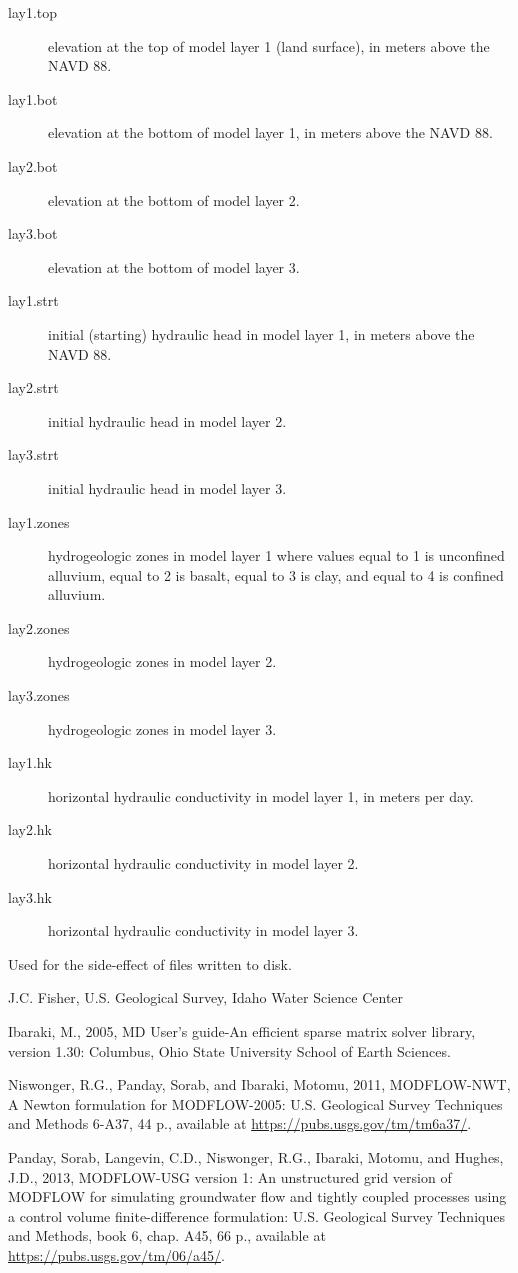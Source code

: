 \documentclass[a4paper]{book}
\begin{document}
\begin{Details}
\begin{description}
\item[lay1.top] elevation at the top of model layer 1 (land surface),
in meters above the NAVD 88.
\item[lay1.bot] elevation at the bottom of model layer 1, in meters above the NAVD 88.
\item[lay2.bot] elevation at the bottom of model layer 2.
\item[lay3.bot] elevation at the bottom of model layer 3.
\item[lay1.strt] initial (starting) hydraulic head in model layer 1,
in meters above the NAVD 88.
\item[lay2.strt] initial hydraulic head in model layer 2.
\item[lay3.strt] initial hydraulic head in model layer 3.
\item[lay1.zones] hydrogeologic zones in model layer 1 where values
equal to 1 is unconfined alluvium, equal to 2 is basalt,
equal to 3 is clay, and equal to 4 is confined alluvium.
\item[lay2.zones] hydrogeologic zones in model layer 2.
\item[lay3.zones] hydrogeologic zones in model layer 3.
\item[lay1.hk] horizontal hydraulic conductivity in model layer 1, in meters per day.
\item[lay2.hk] horizontal hydraulic conductivity in model layer 2.
\item[lay3.hk] horizontal hydraulic conductivity in model layer 3.

\end{description}

\end{Details}
%
\begin{Value}
Used for the side-effect of files written to disk.
\end{Value}
%
\begin{Author}\relax
J.C. Fisher, U.S. Geological Survey, Idaho Water Science Center
\end{Author}
%
\begin{References}\relax
Ibaraki, M., 2005, \eqn{\chi}{}MD User's guide-An efficient sparse matrix solver library, version 1.30:
Columbus, Ohio State University School of Earth Sciences.

Niswonger, R.G., Panday, Sorab, and Ibaraki, Motomu, 2011, MODFLOW-NWT, A Newton formulation for MODFLOW-2005:
U.S. Geological Survey Techniques and Methods 6-A37, 44 p., available at \url{https://pubs.usgs.gov/tm/tm6a37/}.

Panday, Sorab, Langevin, C.D., Niswonger, R.G., Ibaraki, Motomu, and Hughes, J.D., 2013, MODFLOW-USG version 1:
An unstructured grid version of MODFLOW for simulating groundwater flow and tightly coupled processes using a
control volume finite-difference formulation: U.S. Geological Survey Techniques and Methods, book 6, chap. A45,
66 p., available at \url{https://pubs.usgs.gov/tm/06/a45/}.
\end{References}
\end{document}
